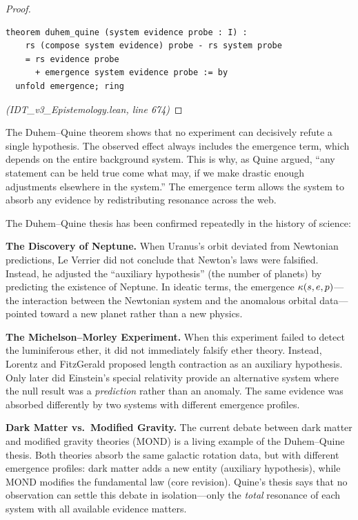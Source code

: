 \begin{proof}
\begin{lstlisting}
theorem duhem_quine (system evidence probe : I) :
    rs (compose system evidence) probe - rs system probe
    = rs evidence probe
      + emergence system evidence probe := by
  unfold emergence; ring
\end{lstlisting}
\textit{(IDT\_v3\_Epistemology.lean, line 674)}
\end{proof}

\begin{interpretation}
The Duhem--Quine theorem shows that no experiment can decisively refute a single
hypothesis. The observed effect always includes the emergence term, which
depends on the entire background system. This is why, as Quine argued,
``any statement can be held true come what may, if we make drastic enough
adjustments elsewhere in the system.'' The emergence term allows the system to
absorb any evidence by redistributing resonance across the web.
\end{interpretation}

\begin{remark}
The Duhem--Quine thesis has been confirmed repeatedly in the history of science:

\textbf{The Discovery of Neptune.} When Uranus's orbit deviated from Newtonian
predictions, Le Verrier did not conclude that Newton's laws were falsified. Instead,
he adjusted the ``auxiliary hypothesis'' (the number of planets) by predicting
the existence of Neptune. In ideatic terms, the emergence $\kappa(s, e, p)$---the
interaction between the Newtonian system and the anomalous orbital data---pointed
toward a new planet rather than a new physics.

\textbf{The Michelson--Morley Experiment.} When this experiment failed to detect
the luminiferous ether, it did not immediately falsify ether theory. Instead,
Lorentz and FitzGerald proposed length contraction as an auxiliary hypothesis.
Only later did Einstein's special relativity provide an alternative system where
the null result was a \emph{prediction} rather than an anomaly. The same evidence
was absorbed differently by two systems with different emergence profiles.

\textbf{Dark Matter vs.\ Modified Gravity.} The current debate between dark
matter and modified gravity theories (MOND) is a living example of the
Duhem--Quine thesis. Both theories absorb the same galactic rotation data,
but with different emergence profiles: dark matter adds a new entity (auxiliary
hypothesis), while MOND modifies the fundamental law (core revision). Quine's
thesis says that no observation can settle this debate in isolation---only the
\emph{total} resonance of each system with all available evidence matters.
\end{remark}

